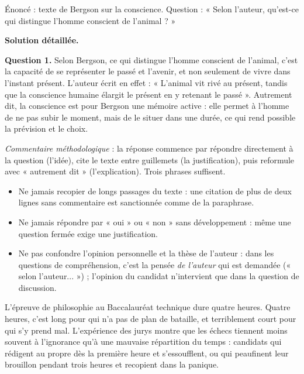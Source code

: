 \documentclass[11pt]{article}
\newcounter{popsec}
\newcounter{popsub}
\newcommand{\courssub}[1]{%
  \stepcounter{popsub}%
  \par\vspace{9pt}\noindent{\popxbold\fontsize{11.5}{13}\selectfont\color{popink}{\color{poporange}\thepopsec.\thepopsub}\hspace{6pt}#1}\par\nopagebreak\vspace{4pt}
}
\begin{document}
\begin{exoresolu}
Énoncé : texte de Bergson sur la conscience. Question : « Selon l'auteur, qu'est-ce qui distingue l'homme conscient de l'animal ? »

\tcblower

\textbf{Solution détaillée.}

\textbf{Question 1.} Selon Bergson, ce qui distingue l'homme conscient de l'animal, c'est la capacité de se représenter le passé et l'avenir, et non seulement de vivre dans l'instant présent. L'auteur écrit en effet : « L'animal vit rivé au présent, tandis que la conscience humaine élargit le présent en y retenant le passé ». Autrement dit, la conscience est pour Bergson une mémoire active : elle permet à l'homme de ne pas subir le moment, mais de le situer dans une durée, ce qui rend possible la prévision et le choix.

\emph{Commentaire méthodologique} : la réponse commence par répondre directement à la question (l'idée), cite le texte entre guillemets (la justification), puis reformule avec « autrement dit » (l'explication). Trois phrases suffisent.
\end{exoresolu}

\begin{attention}
\begin{itemize}
\item Ne jamais recopier de longs passages du texte : une citation de plus de deux lignes sans commentaire est sanctionnée comme de la paraphrase.
\item Ne jamais répondre par « oui » ou « non » sans développement : même une question fermée exige une justification.
\item Ne pas confondre l'opinion personnelle et la thèse de l'auteur : dans les questions de compréhension, c'est la pensée \emph{de l'auteur} qui est demandée (« selon l'auteur... ») ; l'opinion du candidat n'intervient que dans la question de discussion.
\end{itemize}
\end{attention}

\courssub{La gestion du temps pendant l'épreuve}

L'épreuve de philosophie au Baccalauréat technique dure quatre heures. Quatre heures, c'est long pour qui n'a pas de plan de bataille, et terriblement court pour qui s'y prend mal. L'expérience des jurys montre que les échecs tiennent moins souvent à l'ignorance qu'à une mauvaise répartition du temps : candidats qui rédigent au propre dès la première heure et s'essoufflent, ou qui peaufinent leur brouillon pendant trois heures et recopient dans la panique.
\end{document}

